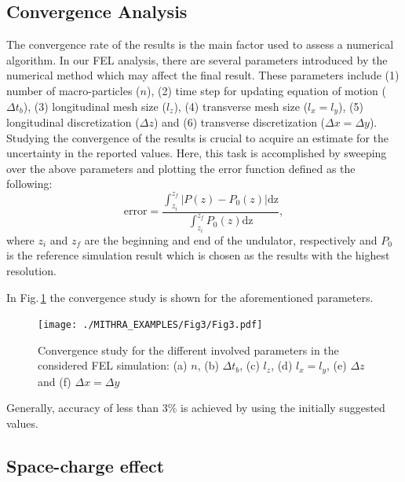 \subsection{Convergence Analysis}

The convergence rate of the results is the main factor used to assess a numerical algorithm.
%
In our FEL analysis, there are several parameters introduced by the numerical method which may affect the final result.
%
These parameters include (1) number of macro-particles ($n$), (2) time step for updating equation of motion ($\Delta t_b$), (3) longitudinal mesh size ($l_z$), (4) transverse mesh size ($l_x=l_y$), (5) longitudinal discretization ($\Delta z$) and (6) transverse discretization ($\Delta x = \Delta y$).
%
Studying the convergence of the results is crucial to acquire an estimate for the uncertainty in the reported values.
%
Here, this task is accomplished by sweeping over the above parameters and plotting the error function defined as the following:
%
\begin{equation}
\label{errorDefinition}
\mathrm{error} = \frac{\int_{z_i}^{z_f} | P(z)-P_0(z) | \mathrm{dz}}{\int_{z_i}^{z_f} P_0(z) \mathrm{dz}},
\end{equation}
%
where $z_i$ and $z_f$ are the beginning and end of the undulator, respectively and $P_0$ is the reference simulation result which is chosen as the results with the highest resolution.

In Fig.\,\ref{convergenceStudy} the convergence study is shown for the aforementioned parameters.
%
\begin{figure}
\centering
\texttt{[image: ./MITHRA\_EXAMPLES/Fig3/Fig3.pdf]}
\caption{Convergence study for the different involved parameters in the considered FEL simulation: (a) $n$, (b) $\Delta t_b$, (c) $l_z$, (d) $l_x=l_y$, (e) $\Delta z$ and (f) $\Delta x = \Delta y$}
\label{convergenceStudy}
\end{figure}
%
Generally, accuracy of less than 3\% is achieved by using the initially suggested values.

\subsection{Space-charge effect}

